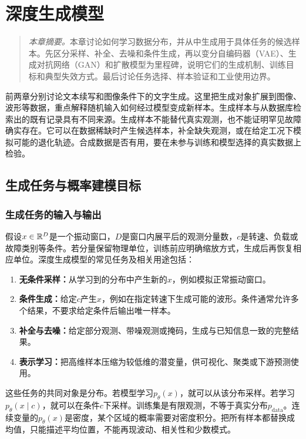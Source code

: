 \chapter{深度生成模型}
\begin{quote}\small
\textit{本章摘要。}本章讨论如何学习数据分布，并从中生成用于具体任务的候选样本。先区分采样、补全、去噪和条件生成，再以变分自编码器（VAE）、生成对抗网络（GAN）和扩散模型为里程碑，说明它们的生成机制、训练目标和典型失效方式。最后讨论任务选择、样本验证和工业使用边界。
\end{quote}

前两章分别讨论文本续写和图像条件下的文字生成。这里把生成对象扩展到图像、波形等数据，重点解释随机输入如何经过模型变成新样本。生成样本与从数据库检索出的既有记录具有不同来源。生成样本不能替代真实观测，也不能证明罕见故障确实存在。它可以在数据稀缺时产生候选样本，补全缺失观测，或在给定工况下模拟可能的退化轨迹。合成数据是否有用，要在未参与训练和模型选择的真实数据上检验。

\section{生成任务与概率建模目标}

\subsection{生成任务的输入与输出}

假设$x\in\mathbb{R}^D$是一个振动窗口，$D$是窗口内展平后的观测分量数，$c$是转速、负载或故障类别等条件。若分量保留物理单位，训练前应明确缩放方式，生成后再恢复相应单位。深度生成模型的常见任务及相关用途包括：
\begin{enumerate}
  \item \textbf{无条件采样：}从学习到的分布中产生新的$x$，例如模拟正常振动窗口。
  \item \textbf{条件生成：}给定$c$产生$x$，例如在指定转速下生成可能的波形。条件通常允许多个结果，不要求给定条件后输出唯一样本。
  \item \textbf{补全与去噪：}给定部分观测、带噪观测或掩码，生成与已知信息一致的完整结果。
  \item \textbf{表示学习：}把高维样本压缩为较低维的潜变量，供可视化、聚类或下游预测使用。
\end{enumerate}

这些任务的共同对象是分布。若模型学习$p_{\theta}(x)$，就可以从该分布采样。若学习$p_{\theta}(x\mid c)$，就可以在条件$c$下采样。训练集是有限观测，不等于真实分布$p_{\mathrm{data}}$。连续变量的$p_{\theta}(x)$是密度，某个区域的概率需要对密度积分。把所有样本都替换成均值，只能描述平均位置，不能再现波动、相关性和少数模式。

